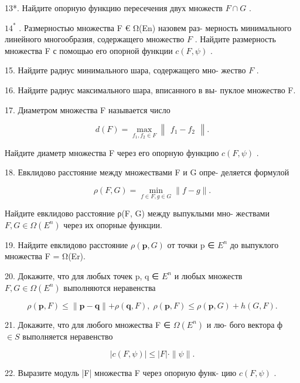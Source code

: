 \documentclass[8pt]{extarticle}
\begin{document}
13*. Найдите опорную функцию пересечения двух множеств \(F \cap  G\) .

\({14}^{ * }\) . Размерностью множества F € Ω(En) назовем раз- мерность минимального линейного многообразия, содержащего множество \(F\) . Найдите размерность множества F с помощью его опорной функции \(c\left( {F,\psi }\right)\) .

15. Найдите радиус минимального шара, содержащего мно- жество \(F\) .

16. Найдите радиус максимального шара, вписанного в вы- пуклое множество F.

17. Диаметром множества F называется число

\[
d\left( F\right)  = \mathop{\max }\limits_{{{f}_{1},{f}_{2} \in  F}}\left\lVert \begin{array}{c} {{f}_{1} - {f}_{2}} \end{array} \right\rVert.
\]

Найдите диаметр множества F через его опорную функцию \(c\left( {F,\psi }\right)\) .

18. Евклидово расстояние между множествами F и G опре- деляется формулой

\[
\rho \left( {F,G}\right)  = \mathop{\min }\limits_{{f \in  F,g \in  G}}\parallel f - g\parallel .
\]

Найдите евклидово расстояние ρ(F, G) между выпуклыми мно- жествами \(F,G \in  \Omega \left( {E}^{n}\right)\) через их опорные функции.

19. Найдите евклидово расстояние \(\rho \left( {\mathbf{p},G}\right)\) от точки p ∈ \({E}^{n}\) до выпуклого множества F = Ω(Er).

20. Докажите, что для любых точек p, q ∈ \({E}^{n}\) и любых множеств \(F,G \in  \Omega \left( {E}^{n}\right)\) выполняются неравенства

\[
\rho \left( {\mathbf{p},F}\right)  \leq  \parallel \mathbf{p} - \mathbf{q}\parallel  + \rho \left( {\mathbf{q},F}\right) ,\;\rho \left( {\mathbf{p},F}\right)  \leq  \rho \left( {\mathbf{p},G}\right)  + h\left( {G,F}\right) .
\]

21. Докажите, что для любого множества F ∈ \(\Omega \left( {E}^{n}\right)\) и лю- бого вектора ф \(\in  S\) выполняется неравенство

\[
\left| {c\left( {F,\psi }\right) }\right|  \leq  \left| F\right|  \cdot  \parallel \psi \parallel .
\]

22. Выразите модуль |F| множества F через опорную функ- цию \(c\left( {F,\psi }\right)\) .
\end{document}
